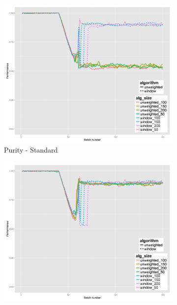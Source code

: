\begin{figure}[!h]
        \centering
        \begin{subfigure}[b]{0.47\textwidth}
          \includegraphics[width=\textwidth]{standard_alt/ci_evolving_pen_34_37_standard_purity.png}         
                 \caption{Purity - Standard}
                 \label{fig:ps_3437}
        \end{subfigure}
        \begin{subfigure}[b]{0.47\textwidth}
                 \includegraphics[width=\textwidth]{standard_alt/ci_evolving_pen_34_37_alternative_purity.png}

\end{subfigure}
\end{figure}
